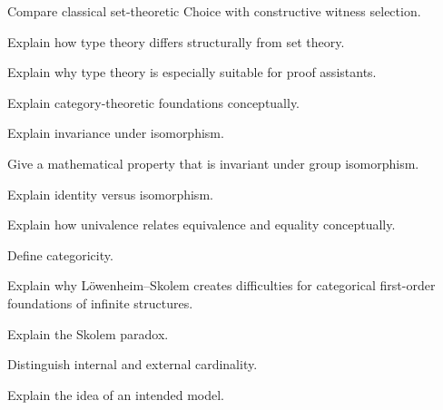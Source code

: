 \begin{exercise}[3]
Compare classical set-theoretic Choice with constructive witness selection.
\end{exercise}

\begin{exercise}[2]
Explain how type theory differs structurally from set theory.
\end{exercise}

\begin{exercise}[3]
Explain why type theory is especially suitable for proof assistants.
\end{exercise}

\begin{exercise}[3]
Explain category-theoretic foundations conceptually.
\end{exercise}

\begin{exercise}[2]
Explain invariance under isomorphism.
\end{exercise}

\begin{exercise}[3]
Give a mathematical property that is invariant under group isomorphism.
\end{exercise}

\begin{exercise}[3]
Explain identity versus isomorphism.
\end{exercise}

\begin{exercise}[3]
Explain how univalence relates equivalence and equality conceptually.
\end{exercise}

\begin{exercise}[2]
Define categoricity.
\end{exercise}

\begin{exercise}[3]
Explain why Löwenheim--Skolem creates difficulties for categorical
first-order foundations of infinite structures.
\end{exercise}

\begin{exercise}[3]
Explain the Skolem paradox.
\end{exercise}

\begin{exercise}[3]
Distinguish internal and external cardinality.
\end{exercise}

\begin{exercise}[3]
Explain the idea of an intended model.
\end{exercise}

